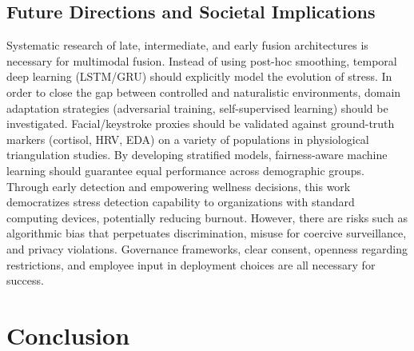 \documentclass[fleqn,10pt]{wlscirep}
\begin{document}
\subsection*{Future Directions and Societal Implications}

Systematic research of late, intermediate, and early fusion architectures is necessary for multimodal fusion. Instead of using post-hoc smoothing, temporal deep learning (LSTM/GRU) should explicitly model the evolution of stress. In order to close the gap between controlled and naturalistic environments, domain adaptation strategies (adversarial training, self-supervised learning) should be investigated. Facial/keystroke proxies should be validated against ground-truth markers (cortisol, HRV, EDA) on a variety of populations in physiological triangulation studies. By developing stratified models, fairness-aware machine learning should guarantee equal performance across demographic groups. Through early detection and empowering wellness decisions, this work democratizes stress detection capability to organizations with standard computing devices, potentially reducing burnout. However, there are risks such as algorithmic bias that perpetuates discrimination, misuse for coercive surveillance, and privacy violations. Governance frameworks, clear consent, openness regarding restrictions, and employee input in deployment choices are all necessary for success.

\section*{Conclusion}
\end{document}
